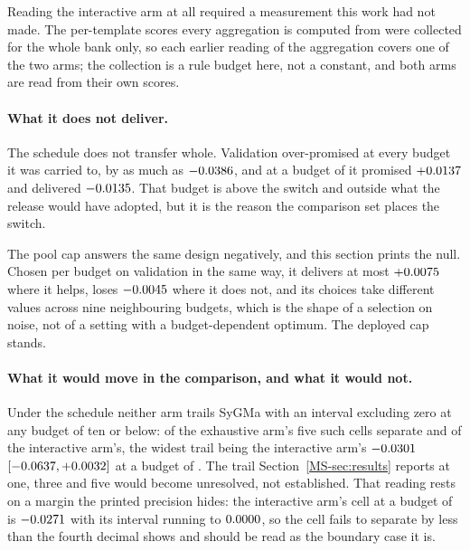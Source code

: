 \documentclass[journal=jcisd8,manuscript=suppinfo,layout=onecolumn]{achemso}
\begin{document}
Reading the interactive arm at all required a measurement this work had not made. The
per-template scores every aggregation is computed from were collected for the whole bank only, so
each earlier reading of the aggregation covers one of the two arms; the collection is a rule
budget here, not a constant, and both arms are read from their own scores.

\paragraph{What it does not deliver.} The schedule does not transfer whole. Validation
over-promised at every budget it was carried to, by as much as $-0.0386$, and at a
budget of \numBlendFlipk{} it promised $+0.0137$ and delivered
$-0.0135$. That budget is above the switch and outside what the release would have
adopted, but it is the reason the comparison set places the switch.

The pool cap answers the same design negatively, and this section prints the null.
Chosen per budget on validation in the same way, it delivers at most $+0.0075$ where it
helps, loses $-0.0045$ where it does not, and its choices take
\numBlendCapchoicesWord{} different values across nine neighbouring budgets, which is the shape of
a selection on noise, not of a setting with a budget-dependent optimum. The deployed cap
stands.

\paragraph{What it would move in the comparison, and what it would not.} Under the schedule
neither arm trails SyGMa with an interval excluding zero at any budget of ten or below:
\numBlendExhSygmaseparatingWord{} of the exhaustive arm's five such cells separate and
\numBlendIntSygmaseparatingWord{} of the interactive arm's, the widest trail being the interactive
arm's $-0.0301$ $[-0.0637, +0.0032]$ at a budget
of \numBlendIntSygmaworstK{}. The trail Section~\ref{MS-sec:results} reports at one, three and
five would become unresolved, not established. That reading rests on a margin the printed
precision hides: the interactive arm's cell at a budget of
\numBlendIntSygmaclosestKWord{} is $-0.0271$ with its interval running to
$0.0000$, so the cell fails to separate by less than the fourth decimal shows
and should be read as the boundary case it is.
\end{document}
